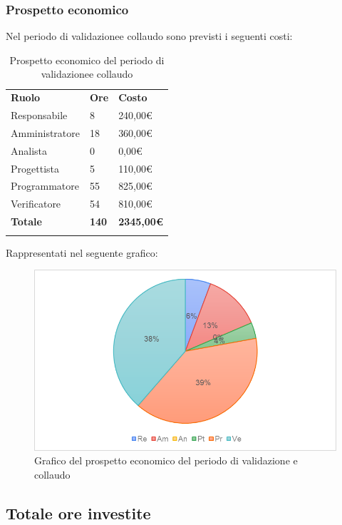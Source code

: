\subsubsection{Prospetto economico}
Nel periodo di validazione\glosp e collaudo sono previsti i seguenti costi:
\begin{longtable} {
		>{}p{32mm}
		>{}p{20mm}
		>{}p{20mm}
	}
	\rowcolor{gray!50}
	
	\textbf{Ruolo} & \textbf{Ore} & \textbf{Costo} \TBstrut \\
	Responsabile & 8 & 240,00\euro{} \TBstrut \\
	Amministratore & 18 & 360,00\euro{} \TBstrut \\
	Analista & 0 & 0,00\euro{} \TBstrut \\
	Progettista & 5 & 110,00\euro{} \TBstrut \\
	Programmatore & 55 & 825,00\euro{} \TBstrut \\
	Verificatore & 54 & 810,00\euro{} \TBstrut \\
	\textbf{Totale} & \textbf{140}& \textbf{2345,00\euro{}} \TBstrut \\	
	\rowcolor{white}
	\caption{Prospetto economico del periodo di validazione\glosp e collaudo}
\end{longtable}
Rappresentati nel seguente grafico:
\begin{figure} [H]
	\includegraphics[width=\linewidth]{./img/Grafici/8.png}
	\caption{Grafico del prospetto economico del periodo di validazione \glosp e collaudo}
\end{figure}

\subsection{Totale ore investite}
